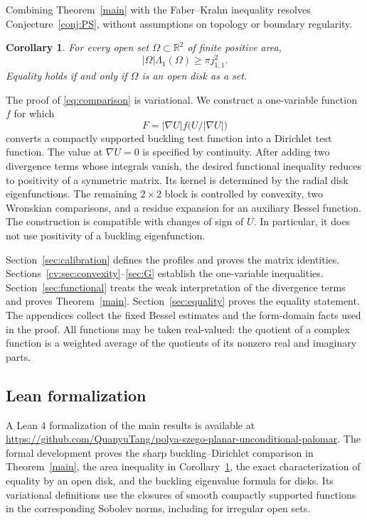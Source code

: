 \documentclass[11pt,letterpaper,reqno]{amsart}
\newtheorem{corollary}[theorem]{Corollary}
\theoremstyle{definition}
\begin{document}
Combining Theorem~\ref{main} with the Faber--Krahn inequality resolves
Conjecture~\ref{conj:PS}, without assumptions on topology or boundary
regularity.
\begin{corollary}\label{cor:area}
For every open set $\Omega\subset\mathbb R^2$ of finite positive area,
\begin{equation}\label{eq:area}
 |\Omega|\Lambda_1(\Omega)\ge\pi j_{1,1}^2.
\end{equation}
Equality holds if and only if $\Omega$ is an open disk as a set.
\end{corollary}

The proof of \eqref{eq:comparison} is variational. We construct a
one-variable function $f$ for which
\[
 F=|\nabla U|f\bigl(U/|\nabla U|\bigr)
\]
converts a compactly supported buckling test function into a Dirichlet
test function. The value at $\nabla U=0$ is specified by continuity.
After adding two divergence terms whose integrals vanish, the desired
functional inequality reduces to positivity of a symmetric matrix.
Its kernel is determined by the radial disk eigenfunctions. The
remaining $2\times2$ block is controlled by convexity, two Wronskian
comparisons, and a residue expansion for an auxiliary Bessel function.
The construction is compatible with changes of sign of $U$. In
particular, it does not use positivity of a buckling eigenfunction.

Section~\ref{sec:calibration} defines the profiles and proves the matrix
identities. Sections~\ref{cv:sec:convexity}--\ref{sec:G} establish the
one-variable inequalities. Section~\ref{sec:functional} treats the weak
interpretation of the divergence terms and proves Theorem~\ref{main}.
Section~\ref{sec:equality} proves the equality statement. The
appendices collect the fixed Bessel estimates and the form-domain facts
used in the proof. All functions may be taken real-valued: the quotient
of a complex function is a weighted average of the quotients of its
nonzero real and imaginary parts.



\subsection*{Lean formalization}

A Lean 4 formalization of the main results is available at
\url{https://github.com/QuanyuTang/polya-szego-planar-unconditional-palomar}.
The formal development proves the sharp buckling--Dirichlet comparison
in Theorem~\ref{main}, the area inequality in Corollary~\ref{cor:area},
the exact characterization of equality by an open disk, and the
buckling eigenvalue formula for disks. Its variational definitions
use the closures of smooth compactly supported functions in the
corresponding Sobolev norms, including for irregular open sets.
\end{document}
